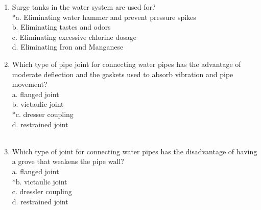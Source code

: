 \begin{enumerate}[1.]
\item Surge tanks in the water system are used for?\\
*a. Eliminating water hammer and prevent pressure spikes\\
b. Eliminating tastes and odors\\
c. Eliminating excessive chlorine dosage\\
d. Eliminating Iron and Manganese

\item Which type of pipe joint for connecting water pipes has the advantage of moderate deflection and the gaskets used to absorb vibration and pipe movement?\\
a. flanged joint\\
b. victaulic joint\\
*c. dresser coupling\\
d. restrained joint\\
\
\item Which type of joint for connecting water pipes has the disadvantage of having a grove that weakens the pipe wall?\\
a. flanged joint\\
*b. victaulic joint\\
c. dressler coupling\\
d. restrained joint\\
\end{enumerate}
